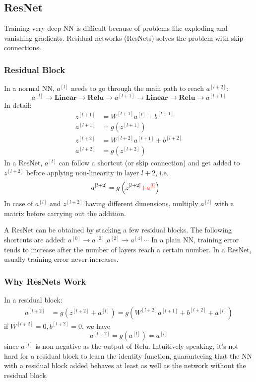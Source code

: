 \subsection{ResNet}
Training very deep NN is difficult because of problems like exploding and vanishing gradients. Residual networks (ResNets) solves the problem with skip connections.
\subsubsection{Residual Block}
In a normal NN, $a^{[l]}$ needs to go through the main path to reach $a^{[l+2]}$:
\[a^{[l]}\rightarrow\textbf{Linear}\rightarrow\textbf{Relu}\rightarrow a^{[l+1]}\rightarrow\textbf{Linear}\rightarrow\textbf{Relu}\rightarrow a^{[l+1]}\]
In detail: 
\begin{align*}
  z^{[l+1]}&=W^{[l+1]}a^{[l]}+b^{[l+1]}\\
  a^{[l+1]}&=g\left(z^{[l+1]}\right)\\
  z^{[l+2]}&=W^{[l+2]}a^{[l+1]}+b^{[l+2]}\\
  a^{[l+2]}&=g\left(z^{[l+2]}\right)
\end{align*}
In a ResNet, $a^{[l]}$ can follow a shortcut (or skip connection) and get added to $z^{[l+2]}$ before applying non-linearity in layer $l+2$, i.e.
\begin{align*}
  a^{[l+2]}&=g\left(z^{[l+2]}{\color{red}+a^{[l]}}\right)
\end{align*}
In case of $a^{[l]}$ and $z^{[l+2]}$ having different dimensions, multiply $a^{[l]}$ with a matrix before carrying out the addition.

A ResNet can be obtained by stacking a few residual blocks. The following shortcuts are added: $a^{[0]}\rightarrow a^{[2]}$,$a^{[2]}\rightarrow a^{[4]}\cdots$
In a plain NN, training error tends to increase after the number of layers reach a certain number. In a ResNet, usually training error never increases.
\subsubsection{Why ResNets Work}
In a residual block: 
\begin{align*}
  a^{[l+2]}&=g\left(z^{[l+2]}+a^{[l]}\right)=g\left(W^{[l+2]}a^{[l+1]}+b^{[l+2]}+a^{[l]}\right)
\end{align*}
if $W^{[l+2]}=0,b^{[l+2]}=0$, we have
\[a^{[l+2]}=g\left(a^{[l]}\right)=a^{[l]}\]
since $a^{[l]}$ is non-negative as the output of Relu. Intuitively speaking, it's not hard for a residual block to learn the identity function, guaranteeing that the NN with a residual block added behaves at least as well as the network without the residual block.
\ifx\PREAMBLE\undefined

\fi